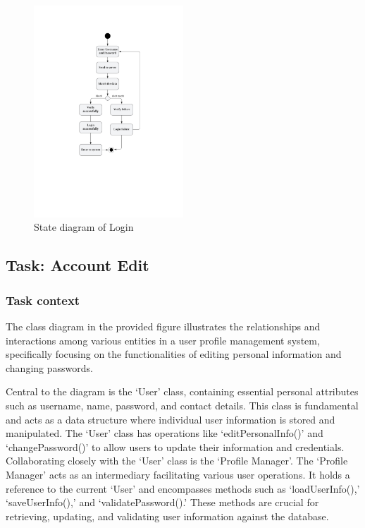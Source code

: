 \documentclass[conference]{IEEEtran}
\begin{document}
\begin{figure}[htbp]
	\centerline{\includegraphics[width=0.5\textwidth]{Diagram_of_Login_and_Register/State_diagram_of_login.pdf}}
	\caption{State diagram of Login }
	\label{State_diagram_of_login}
\end{figure}
\subsection{\textbf{Task: Account Edit }}

\subsubsection{\textbf{Task context }}
\textbf{ }

The class diagram in the provided figure illustrates the relationships and interactions among various entities in a user profile management system, specifically focusing on the functionalities of editing personal information and changing passwords.

Central to the diagram is the ‘User’ class, containing essential personal attributes such as username, name, password, and contact details. This class is fundamental and acts as a data structure where individual user information is stored and manipulated. The ‘User’ class has operations like ‘editPersonalInfo()’ and ‘changePassword()’ to allow users to update their information and credentials.
Collaborating closely with the ‘User’ class is the ‘Profile Manager’. The ‘Profile Manager’ acts as an intermediary facilitating various user operations. It holds a reference to the current ‘User’ and encompasses methods such as ‘loadUserInfo(),’ ‘saveUserInfo(),’ and ‘validatePassword().’ These methods are crucial for retrieving, updating, and validating user information against the database.
\end{document}
